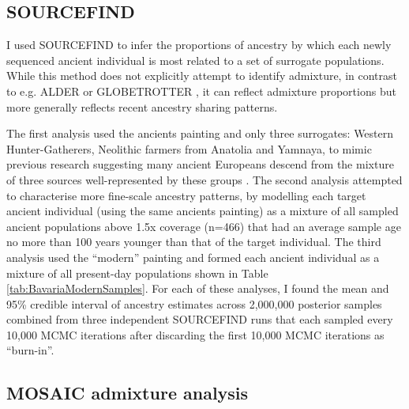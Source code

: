\subsection{SOURCEFIND} \label{sec:ch4_SOURCEFIND}

I used SOURCEFIND \cite{Chacon-Duque2018} to infer the proportions of ancestry by which each newly sequenced ancient individual is most related to a set of surrogate populations. While this method does not explicitly attempt to identify admixture, in contrast to e.g. ALDER \cite{LohAlderAdmixture} or GLOBETROTTER \cite{Hellenthal2014}, it can reflect admixture proportions \cite{Chacon-Duque2018} but more generally reflects recent ancestry sharing patterns.

The first analysis used the ancients painting and only three surrogates: Western Hunter-Gatherers, Neolithic farmers from Anatolia and Yamnaya, to mimic previous research suggesting many ancient Europeans descend from the mixture of three sources well-represented by these groups \cite{Lazaridis2014}. The second analysis attempted to characterise more fine-scale ancestry patterns, by modelling each target ancient individual (using the same ancients painting) as a mixture of all sampled ancient populations above 1.5x coverage (n=466) that had an average sample age no more than 100 years younger than that of the target individual. The third analysis used the ``modern'' painting and formed each ancient individual as a mixture of all present-day populations shown in Table \ref{tab:BavariaModernSamples}. For each of these analyses, I found the mean and 95\% credible interval of ancestry estimates across 2,000,000 posterior samples combined from three independent SOURCEFIND runs that each sampled every 10,000 MCMC iterations after discarding the first 10,000 MCMC iterations as ``burn-in''.


\subsection{MOSAIC admixture analysis}


